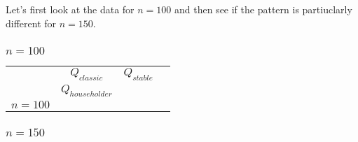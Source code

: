 \documentclass[a4paper,11pt]{article}
\begin{document}
Let's first look at the data for $n=100$ and then see if
the pattern is partiuclarly different for $n=150$.

\subsubsection{$n=100$}

\begin{tabular}{r|c|c|c|}
  \multicolumn{1}{r}{}
   & \multicolumn{1}{c}{$Q_{classic}$ }
   & \multicolumn{1}{c}{$Q_{stable}$}  \\
   & \multicolumn{1}{c}{$Q_{householder}$} \\
  \cline{2-4}
  $n=100$ & 
          & 
          & 
          \\ \cline{2-4}
\end{tabular}




\subsubsection{$n=150$}


\end{document}
